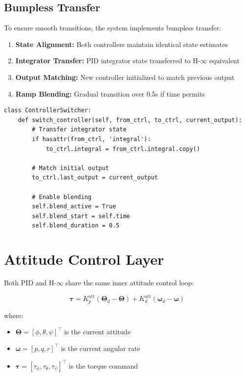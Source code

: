 \subsection{Bumpless Transfer}

To ensure smooth transitions, the system implements bumpless transfer:

\begin{enumerate}
    \item \textbf{State Alignment:} Both controllers maintain identical state estimates
    \item \textbf{Integrator Transfer:} PID integrator state transferred to H-$\infty$ equivalent
    \item \textbf{Output Matching:} New controller initialized to match previous output
    \item \textbf{Ramp Blending:} Gradual transition over 0.5s if time permits
\end{enumerate}

\begin{lstlisting}[caption={Bumpless transfer implementation}]
class ControllerSwitcher:
    def switch_controller(self, from_ctrl, to_ctrl, current_output):
        # Transfer integrator state
        if hasattr(from_ctrl, 'integral'):
            to_ctrl.integral = from_ctrl.integral.copy()

        # Match initial output
        to_ctrl.last_output = current_output

        # Enable blending
        self.blend_active = True
        self.blend_start = self.time
        self.blend_duration = 0.5
\end{lstlisting}

\section{Attitude Control Layer}

Both PID and H-$\infty$ share the same inner attitude control loop:

\begin{equation}
    \boldsymbol{\tau} = K_p^{\text{att}} (\boldsymbol{\Theta}_d - \boldsymbol{\Theta}) + K_d^{\text{att}} (\boldsymbol{\omega}_d - \boldsymbol{\omega})
\end{equation}

where:
\begin{itemize}
    \item $\boldsymbol{\Theta} = [\phi, \theta, \psi]^\top$ is the current attitude
    \item $\boldsymbol{\omega} = [p, q, r]^\top$ is the current angular rate
    \item $\boldsymbol{\tau} = [\tau_\phi, \tau_\theta, \tau_\psi]^\top$ is the torque command
\end{itemize}

